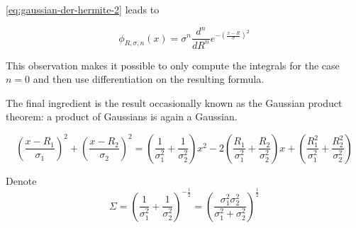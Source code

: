 \documentclass{article}
\begin{document}
\begin{appendices}
\eqref{eq:gaussian-der-hermite-2} leads to

\begin{equation} \label{eq:hgto-param}
\phi_{R,\sigma,n}(x) = \sigma^n \frac{d^n}{dR^n}e^{-\left(\frac{x-R}{\sigma}\right)^2}
\end{equation}

This observation makes it possible to only compute the integrals for the case \begin{math}n=0\end{math} and then use differentiation on the resulting formula.

The final ingredient is the result occasionally known as the Gaussian product theorem: a product of Gaussians is again a Gaussian. 

\begin{equation} \label{eq:gaussian-prod-1}
\left(\frac{x-R_1}{\sigma_1}\right)^2 + \left(\frac{x-R_2}{\sigma_2}\right)^2 = \left(\frac{1}{\sigma_1^2}+\frac{1}{\sigma_2^2}\right)x^2
- 2 \left(\frac{R_1}{\sigma_1^2}+\frac{R_2}{\sigma_2^2}\right)x + \left(\frac{R_1^2}{\sigma_1^2}+\frac{R_2^2}{\sigma_2^2}\right)
\end{equation}

Denote
\begin{equation}
\Sigma = \left(\frac{1}{\sigma_1^2}+\frac{1}{\sigma_2^2}\right)^{-\frac{1}{2}} = \left(\frac{\sigma_1^2\sigma_2^2}{\sigma_1^2+\sigma_2^2}\right)^\frac{1}{2}
\end{equation}


\end{appendices}
\end{document}
